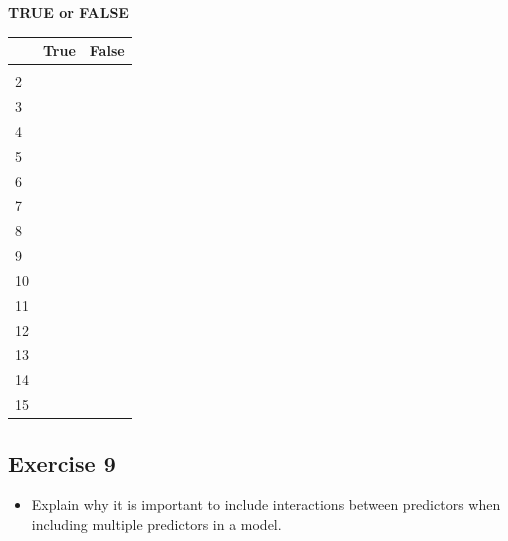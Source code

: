 \documentclass[
]{article}
\providecommand{\tightlist}{%
  \setlength{\itemsep}{0pt}\setlength{\parskip}{0pt}}
\begin{document}
\textbf{TRUE or FALSE}

\begin{longtable}[]{@{}lll@{}}
\toprule\noalign{}
& True & False \\
\midrule\noalign{}
\endhead
\bottomrule\noalign{}
\endlastfoot
1 & & \\
2 & & \\
3 & & \\
4 & & \\
5 & & \\
6 & & \\
7 & & \\
8 & & \\
9 & & \\
10 & & \\
11 & & \\
12 & & \\
13 & & \\
14 & & \\
15 & & \\
\end{longtable}

\hypertarget{exercise-9}{%
\subsection{Exercise 9}\label{exercise-9}}

\begin{itemize}
\tightlist
\item
  Explain why it is important to include interactions between predictors
  when including multiple predictors in a model.
\end{itemize}
\end{document}
